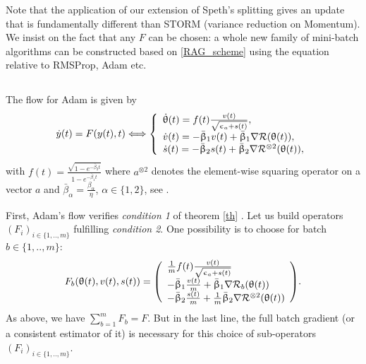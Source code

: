 \documentclass[article,authoryear,jmlmc]{beg_32}             %
\begin{document}
        Note that the application of our extension of Speth's splitting gives an update that is fundamentally different than STORM (variance reduction on Momentum). 
        We insist on the fact that any $F$ can be chosen: a whole new family of mini-batch algorithms can be constructed based on \eqref{RAG_scheme} using the
        equation relative to RMSProp, Adam etc.

\subsection{}
\label{adam}
The flow for Adam is given by \cite{bianchi,Bilel,Bilel_thesis}
\begin{eqnarray}
  \label{Flow_adam}
  \dot{y}(t) = F(y(t),t) \Longleftrightarrow  \left\{\begin{array}{l}
    \dot{\theta}(t)= f(t) \frac{v(t)}{\sqrt{\epsilon_a+s(t)}},\\
    \dot{v}(t)= -\bar{\beta}_1 v(t)+\bar{\beta}_1\nR(\theta(t)),\\
    \dot{s}(t)= -\bar{\beta}_2 s(t)+\bar{\beta}_2\nR^{\otimes 2}(\theta(t)),\\
  \end{array}\right.
\end{eqnarray}
with $f(t)= \frac{\sqrt{1-e^{-\bar{\beta}_2 t}}}{1-e^{-\bar{\beta}_1 t}}$
    where $a^{\otimes 2}$  denotes the element-wise squaring operator on a vector $a$ and $\bar{\beta}_\alpha = \frac{\beta_\alpha}{\eta}$, $\alpha\in\{1,2\}$, see \cite{Bilel}.

First, Adam's flow verifies {\em condition 1} of theorem \ref{th} \cite{Bilel}.
Let us build operators $(F_i)_{i\in\{1,..,m\}}$ fulfilling {\em condition 2}.
One possibility is to choose for batch $b\in\{1,..,m\}$:
\begin{eqnarray}
\label{F_j_adam_1}
F_b(\theta(t),v(t),s(t))=\left(\begin{array}{l}
  \frac{1}{m}f(t) \frac{v(t)}{\sqrt{\epsilon_a+s(t)}}\\
     -\bar{\beta}_1 \frac{v(t)}{m}+\bar{\beta}_1\nR_b(\theta(t))\\
     -\bar{\beta}_2 \frac{s(t)}{m}+\frac{1}{m}\bar{\beta}_2\nR^{\otimes 2}(\theta(t))\\
  \end{array}\right).
\end{eqnarray}
As above, we have $\sum_{b=1}^m F_b=F$. But in the last line, the full batch gradient (or a consistent estimator of it) is necessary for this choice of sub-operators $(F_i)_{i\in\{1,..,m\}}$. 
\end{document}
